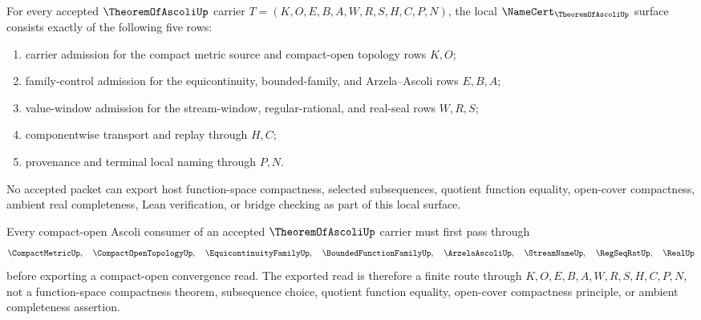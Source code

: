 \begin{theorem}
\label{thm:theorem-of-ascoli-namecert-obligations}
For every accepted $\TheoremOfAscoliUp$ carrier $T=(K,O,E,B,A,W,R,S,H,C,P,N)$, the local $\NameCert_{\TheoremOfAscoliUp}$ surface consists exactly of the following five rows:
\begin{enumerate}
\item carrier admission for the compact metric source and compact-open topology rows $K,O$;
\item family-control admission for the equicontinuity, bounded-family, and Arzela--Ascoli rows $E,B,A$;
\item value-window admission for the stream-window, regular-rational, and real-seal rows $W,R,S$;
\item componentwise transport and replay through $H,C$;
\item provenance and terminal local naming through $P,N$.
\end{enumerate}
No accepted packet can export host function-space compactness, selected subsequences, quotient function equality, open-cover compactness, ambient real completeness, Lean verification, or bridge checking as part of this local surface.
\end{theorem}

\begin{theorem}
\label{thm:theorem-of-ascoli-compact-open-handoff}
Every compact-open Ascoli consumer of an accepted $\TheoremOfAscoliUp$ carrier must first pass through
$$
\CompactMetricUp,\quad
\CompactOpenTopologyUp,\quad
\EquicontinuityFamilyUp,\quad
\BoundedFunctionFamilyUp,\quad
\ArzelaAscoliUp,\quad
\StreamNameUp,\quad
\RegSeqRatUp,\quad
\RealUp
$$
before exporting a compact-open convergence read. The exported read is therefore a finite route through $K,O,E,B,A,W,R,S,H,C,P,N$, not a function-space compactness theorem, subsequence choice, quotient function equality, open-cover compactness principle, or ambient completeness assertion.
\end{theorem}


